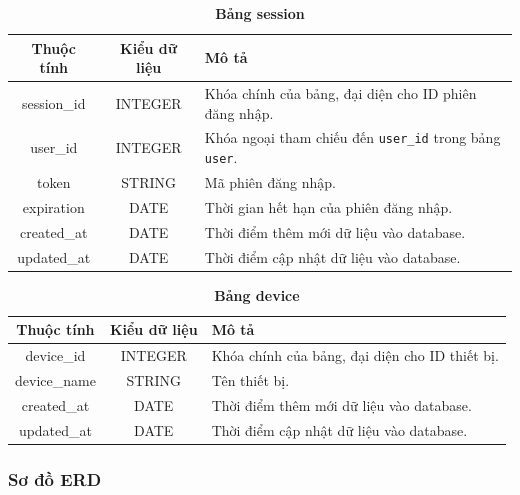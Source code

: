 \begin{table}[H]
  \caption{\bfseries \fontsize{12pt}{0pt}\selectfont Bảng session}
  \centering
  \begin{tabularx}{0.9\textwidth}{|c|c|X|}
    \hline
    \textbf{Thuộc tính} & \textbf{Kiểu dữ liệu} & \textbf{Mô tả} \\
    \hline
    session\_id & INTEGER & Khóa chính của bảng, đại diện cho ID phiên đăng nhập. \\
    \hline
    user\_id & INTEGER & Khóa ngoại tham chiếu đến \texttt{user\_id} trong bảng \texttt{user}. \\
    \hline
    token & STRING & Mã phiên đăng nhập. \\
    \hline
    expiration & DATE & Thời gian hết hạn của phiên đăng nhập. \\
    \hline
    created\_at & DATE & Thời điểm thêm mới dữ liệu vào database. \\
    \hline
    updated\_at & DATE & Thời điểm cập nhật dữ liệu vào database. \\
    \hline
  \end{tabularx}
\end{table}

\begin{table}[H]
  \caption{\bfseries \fontsize{12pt}{0pt}\selectfont Bảng device}
  \centering
  \begin{tabularx}{0.9\textwidth}{|c|c|X|}
    \hline
    \textbf{Thuộc tính} & \textbf{Kiểu dữ liệu} & \textbf{Mô tả} \\
    \hline
    device\_id & INTEGER & Khóa chính của bảng, đại diện cho ID thiết bị. \\
    \hline
    device\_name & STRING & Tên thiết bị. \\
    \hline
    created\_at & DATE & Thời điểm thêm mới dữ liệu vào database. \\
    \hline
    updated\_at & DATE & Thời điểm cập nhật dữ liệu vào database. \\
    \hline
  \end{tabularx}
\end{table}

\subsubsection{Sơ đồ ERD}

